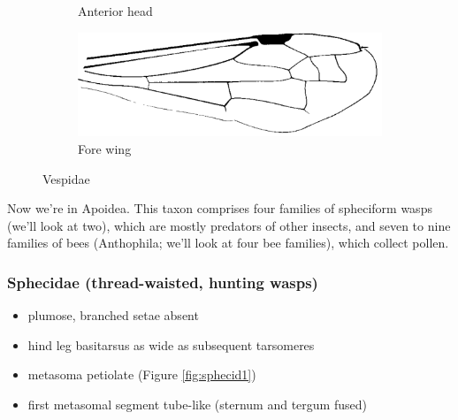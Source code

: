 \documentclass[letterpaper, 11pt]{article}
\begin{document}
\begin{figure}[ht!]
\begin{subfigure}[ht!]{0.2\textwidth}
        \caption{Anterior head \citep[][pg. 214]{goulet1993hymenoptera}}
        \label{fig:vespid2}
    \end{subfigure}
    \hfill
    \begin{subfigure}[ht!]{0.45\textwidth}
        \includegraphics[width=\textwidth]{VespidWing}
        \caption{Fore wing \citep[][pg. 214]{goulet1993hymenoptera}}
        \label{fig:vespid3}
    \end{subfigure}
    \caption{Vespidae}\label{fig:vespids}
\end{figure}
\FloatBarrier

\noindent{}Now we're in Apoidea. This taxon comprises four families of spheciform wasps (we'll look at two), which are mostly predators of other insects, and seven to nine families of bees (Anthophila; we'll look at four bee families), which collect pollen. \\

\subsubsection{Sphecidae (thread-waisted, hunting wasps)}
\begin{itemize}
\item plumose, branched setae absent
\item hind leg basitarsus as wide as subsequent tarsomeres 
\item metasoma petiolate (Figure \ref{fig:sphecid1})
\item first metasomal segment tube-like (sternum and tergum fused)
\end{itemize}
\end{document}
